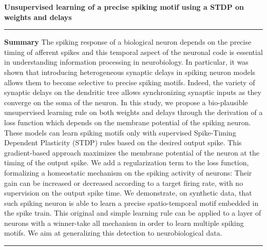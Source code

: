 \documentclass[11pt]{article}
\begin{document}
{\Large\bf %
Unsupervised learning of a precise spiking motif using a STDP on weights and delays
}\\

\hrule
\textbf{Summary} %
The spiking response of a biological neuron depends on the precise timing of afferent spikes and this temporal aspect of the neuronal code is essential in understanding information processing in neurobiology. In particular, it was shown that introducing heterogeneous synaptic delays in spiking neuron models allows them to become selective to precise spiking motifs. Indeed, the variety of synaptic delays on the dendritic tree allows synchronizing synaptic inputs as they converge on the soma of the neuron. In this study, we propose a bio-plausible unsupervised learning rule on both weights and delays through the derivation of a loss function which depends on the membrane potential of the spiking neuron. These models can learn spiking motifs only with supervised Spike-Timing Dependent Plasticity (STDP) rules based on the desired output spike. This gradient-based approach maximizes the membrane potential of the neuron at the timing of the output spike. We add a regularization term to the loss function, formalizing a homeostatic mechanism on the spiking activity of neurons: Their gain can be increased or decreased according to a target firing rate, with no supervision on the output spike time. We demonstrate, on synthetic data, that such spiking neuron is able to learn a precise spatio-temporal motif embedded in the spike train. This original and simple learning rule can be applied to a layer of neurons with a winner-take all mechanism in order to learn multiple spiking motifs. We aim at generalizing this detection to neurobiological data. %
\vspace{.5cm}
\hrule
\end{document}
